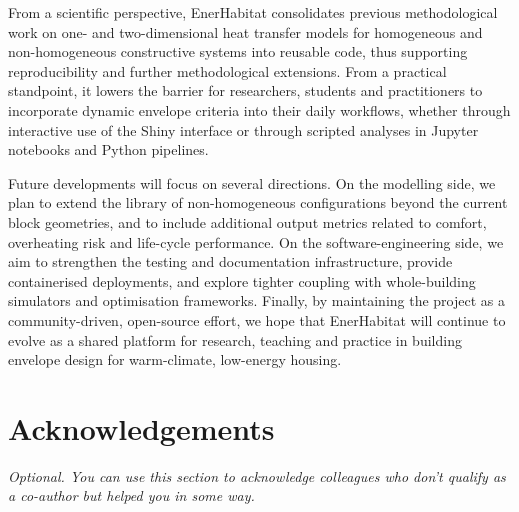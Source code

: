 \documentclass[preprint,12pt, a4paper]{elsarticle}
\begin{document}
From a scientific perspective, EnerHabitat consolidates previous methodological work on one- and two-dimensional heat transfer models for homogeneous and non-homogeneous constructive systems into reusable code, thus supporting reproducibility and further methodological extensions.\citep{barrios2016enerhabitat,barrios2011wall,barrios2012envelope} From a practical standpoint, it lowers the barrier for researchers, students and practitioners to incorporate dynamic envelope criteria into their daily workflows, whether through interactive use of the Shiny interface or through scripted analyses in Jupyter notebooks and Python pipelines.

Future developments will focus on several directions. On the modelling side, we plan to extend the library of non-homogeneous configurations beyond the current block geometries, and to include additional output metrics related to comfort, overheating risk and life-cycle performance. On the software-engineering side, we aim to strengthen the testing and documentation infrastructure, provide containerised deployments, and explore tighter coupling with whole-building simulators and optimisation frameworks. Finally, by maintaining the project as a community-driven, open-source effort, we hope that EnerHabitat will continue to evolve as a shared platform for research, teaching and practice in building envelope design for warm-climate, low-energy housing.




\section*{Acknowledgements}
\label{}
\textit{Optional. You can use this section to acknowledge colleagues who don’t qualify as a co-author but helped you in some way. }





\end{document}
